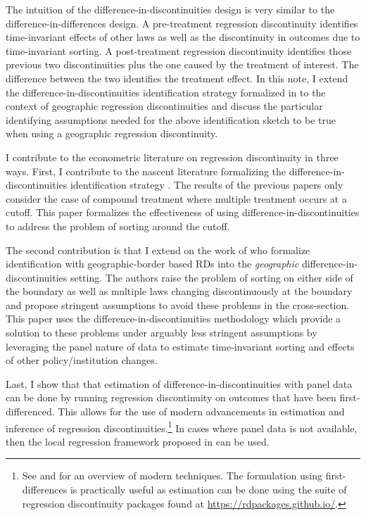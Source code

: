 \documentclass[12pt]{article}
\begin{document}
The intuition of the difference-in-discontinuities design is very similar to the difference-in-differences design. A pre-treatment regression discontinuity identifies time-invariant effects of other laws as well as the discontinuity in outcomes due to time-invariant sorting. A post-treatment regression discontinuity identifies those previous two discontinuities plus the one caused by the treatment of interest. The difference between the two identifies the treatment effect. In this note, I extend the difference-in-discontinuities identification strategy formalized in \citet{Grembi_Nannicini_Troiano_2016} to the context of geographic regression discontinuities and discuss the particular identifying assumptions needed for the above identification sketch to be true when using a geographic regression discontinuity. 

I contribute to the econometric literature on regression discontinuity in three ways. First, I contribute to the nascent literature formalizing the difference-in-discontinuities identification strategy \citep{Grembi_Nannicini_Troiano_2016,Galindo-Silva_Some_Tchuente_2021,Millan-Quijano_2020}. The results of the previous papers only consider the case of compound treatment where multiple treatment occurs at a cutoff. This paper formalizes the effectiveness of using difference-in-discontinuities to address the problem of sorting around the cutoff.

The second contribution is that I extend on the work of \citet{Keele_Titiunik_2015} who formalize identification with geographic-border based RDs into the \emph{geographic} difference-in-discontinuities setting. The authors raise the problem of sorting on either side of the boundary as well as multiple laws changing discontinuously at the boundary and propose stringent assumptions to avoid these problems in the cross-section. This paper uses the  difference-in-discontinuities methodology which provide a solution to these problems under arguably less stringent assumptions by leveraging the panel nature of data to estimate time-invariant sorting and effects of other policy/institution changes.

Last, I show that that estimation of difference-in-discontinuities with panel data can be done by running regression discontinuity on outcomes that have been first-differenced. This allows for the use of modern advancements in estimation and inference of regression discontinuities.\footnote{See \citet{Cattaneo_Idrobo_Titiunik_2019} and \citet{Cattaneo_Idrobo_Titiunik} for an overview of modern techniques. The formulation using first-differences is practically useful as estimation can be done using the suite of regression discontinuity packages found at \href{https://rdpackages.github.io/}{{https://rdpackages.github.io/}}.} In cases where panel data is not available, then the local regression framework proposed in \citet{Grembi_Nannicini_Troiano_2016} can be used.
\end{document}
